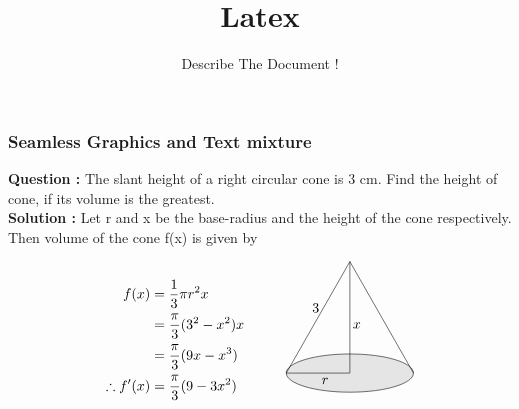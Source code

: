 \documentclass{beamer}
\title{Latex}
\subtitle{Describe The Document !}
\begin{document}
 


\frame {
		\titlepage
	}





\frame
{
\frametitle{Seamless Graphics and Text mixture } 

\textbf{Question :} The slant height of a right circular cone is 3 cm. Find the height of cone, if its volume is the greatest.\\
\vspace{0.4cm}
\textbf{Solution :} Let r  and x  be the base-radius and the height of the cone respectively. Then volume of the cone f(x) is given by

\begin{equation} \nonumber
\begin{alignedat}{4}
f(x) &= \frac{1}{3}\pi r^2x\\
&= \frac{\pi}{3}(3^2-x^2)x\\
&= \frac{\pi}{3}(9x - x^3)\\
\therefore f'(x) &=  \frac{\pi}{3}(9 - 3x^2)\\
\end{alignedat}
\quad\quad\quad
\begin{alignedat}{4}
\begin{tikzpicture}[scale=0.8]
\filldraw[fill=gray!20](0,0) ellipse (2cm and 0.6cm);
\draw (0,0) -- node[below] {\ \ \ $x$}(0,3.5);
\draw (0,0)  -- node[below] {\ \ \ $r$} (-2,0);
\draw  (-2,0) --node[above] {3\ \ }(0,3.5);
\draw  (2,0) -- (0,3.5);
\end{tikzpicture}\\\\
\end{alignedat}
\end{equation}
}

\end{document}
